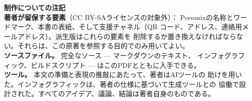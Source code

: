 \clearpage
\thispagestyle{empty}
\begin{flushleft}\small\sffamily
\textbf{制作についての注記}\\[1.2em]

\textbf{著者が留保する要素}（CC BY-SAライセンスの対象外）：
Personixの名称とワードマーク、本書の表紙、そして支援チャネル（QR
コード、アドレス、連絡用メールアドレス）。派生版はこれらの要素を
削除するか置き換えなければならない。それらは、この原著を参照する目的でのみ用いてよい。\\[1.2em]

\textbf{ソースファイル。} 完全なソース --- マークダウンのテキスト、
インフォグラフィック、ビルドスクリプト --- はこのPDFとともに入手できる。\\[1.2em]

\textbf{ツール。} 本文の準備と表現の推敲にあたって、著者はAIツールの
助けを用いた。インフォグラフィックは、著者の仕様に基づいて生成ツールとの
協働で設計された。すべてのアイデア、議論、結論は著者自身のものである。
\end{flushleft}
\clearpage
